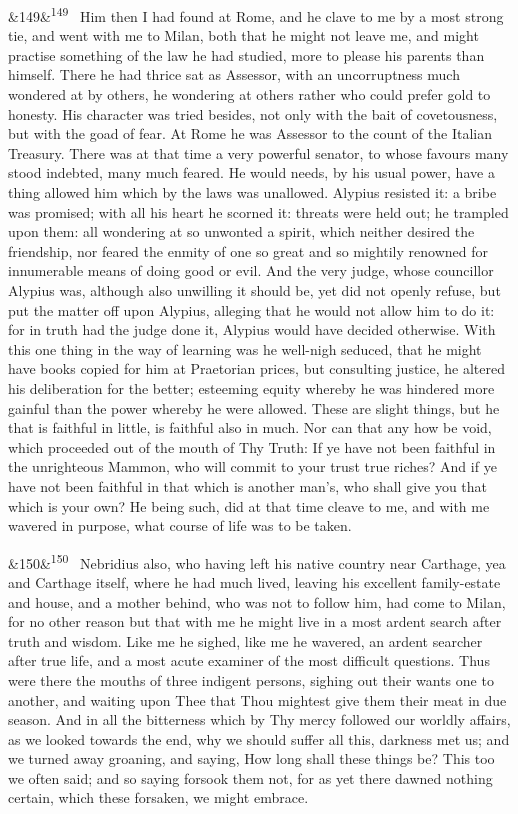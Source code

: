 \documentclass[12pt]{article}
\newcommand{\para}[1][]{\par\noindent\ifx&#1&\else\textsuperscript{\footnotesize #1}~\fi}
\begin{document}
\para[149] Him then I had found at Rome, and he clave to me by a most strong tie, and went with me to Milan, both that he might not leave me, and might practise something of the law he had studied, more to please his parents than himself. There he had thrice sat as Assessor, with an uncorruptness much wondered at by others, he wondering at others rather who could prefer gold to honesty. His character was tried besides, not only with the bait of covetousness, but with the goad of fear. At Rome he was Assessor to the count of the Italian Treasury. There was at that time a very powerful senator, to whose favours many stood indebted, many much feared. He would needs, by his usual power, have a thing allowed him which by the laws was unallowed. Alypius resisted it: a bribe was promised; with all his heart he scorned it: threats were held out; he trampled upon them: all wondering at so unwonted a spirit, which neither desired the friendship, nor feared the enmity of one so great and so mightily renowned for innumerable means of doing good or evil. And the very judge, whose councillor Alypius was, although also unwilling it should be, yet did not openly refuse, but put the matter off upon Alypius, alleging that he would not allow him to do it: for in truth had the judge done it, Alypius would have decided otherwise. With this one thing in the way of learning was he well-nigh seduced, that he might have books copied for him at Praetorian prices, but consulting justice, he altered his deliberation for the better; esteeming equity whereby he was hindered more gainful than the power whereby he were allowed. These are slight things, but he that is faithful in little, is faithful also in much. Nor can that any how be void, which proceeded out of the mouth of Thy Truth: If ye have not been faithful in the unrighteous Mammon, who will commit to your trust true riches? And if ye have not been faithful in that which is another man's, who shall give you that which is your own? He being such, did at that time cleave to me, and with me wavered in purpose, what course of life was to be taken.

\para[150] Nebridius also, who having left his native country near Carthage, yea and Carthage itself, where he had much lived, leaving his excellent family-estate and house, and a mother behind, who was not to follow him, had come to Milan, for no other reason but that with me he might live in a most ardent search after truth and wisdom. Like me he sighed, like me he wavered, an ardent searcher after true life, and a most acute examiner of the most difficult questions. Thus were there the mouths of three indigent persons, sighing out their wants one to another, and waiting upon Thee that Thou mightest give them their meat in due season. And in all the bitterness which by Thy mercy followed our worldly affairs, as we looked towards the end, why we should suffer all this, darkness met us; and we turned away groaning, and saying, How long shall these things be? This too we often said; and so saying forsook them not, for as yet there dawned nothing certain, which these forsaken, we might embrace.
\end{document}

